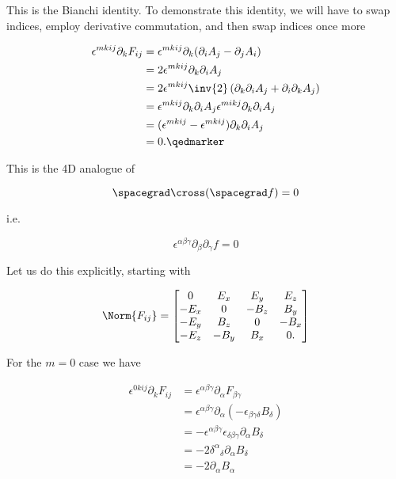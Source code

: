 This is the Bianchi identity.  To demonstrate this identity, we will have to swap indices, employ derivative commutation, and then swap indices once more

\begin{equation}\label{eqn:relativisticElectrodynamicsL11b:1380}
\begin{aligned}
\epsilon^{m k i j} \partial_k F_{i j} 
&= \epsilon^{m k i j} \partial_k (\partial_i A_j - \partial_j A_i) \\
&= 2 \epsilon^{m k i j} \partial_k \partial_i A_j \\
&= 2 \epsilon^{m k i j} \inv{2} \left( \partial_k \partial_i A_j + \partial_i \partial_k A_j \right) \\
&= 
\epsilon^{m k i j} \partial_k \partial_i A_j 
\epsilon^{m i k j} \partial_k \partial_i A_j  \\
&= 
(\epsilon^{m k i j} - \epsilon^{m k i j}) \partial_k \partial_i A_j \\
&= 0. \qedmarker
\end{aligned}
\end{equation}

This is the 4D analogue of 

\begin{equation}\label{eqn:relativisticElectrodynamicsL11:790}
\spacegrad \cross (\spacegrad f) = 0
\end{equation}

i.e.

\begin{equation}\label{eqn:relativisticElectrodynamicsL11:810}
\epsilon^{\alpha\beta\gamma} \partial_\beta \partial_\gamma f = 0
\end{equation}

Let us do this explicitly, starting with

\begin{equation}\label{eqn:relativisticElectrodynamicsL11:370b}
\Norm{ F_{i j} } = 
\begin{bmatrix}
0 & E_x & E_y & E_z \\
-E_x & 0 & -B_z & B_y \\
-E_y & B_z & 0 & -B_x \\
-E_z & -B_y & B_x & 0.
\end{bmatrix}
\end{equation}

For the $m= 0$ case we have

\begin{equation}\label{eqn:relativisticElectrodynamicsL11b:1400}
\begin{aligned}
\epsilon^{0 k i j} \partial_k F_{i j}
&=
\epsilon^{\alpha \beta \gamma} \partial_\alpha F_{\beta \gamma} \\
&= 
\epsilon^{\alpha \beta \gamma} \partial_\alpha (-\epsilon_{\beta \gamma \delta} B_\delta) \\
&= 
-\epsilon^{\alpha \beta \gamma} \epsilon_{\delta \beta \gamma }
\partial_\alpha B_\delta \\
&= 
- 2 {\delta^\alpha}_\delta \partial_\alpha B_\delta \\
&= 
- 2 \partial_\alpha B_\alpha 
\end{aligned}
\end{equation}

